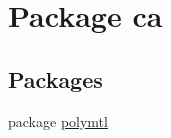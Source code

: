 \hypertarget{namespaceca}{\section{Package ca}
\label{namespaceca}
}
\subsection*{Packages}
\begin{DoxyCompactItemize}
\item 
package \hyperlink{namespaceca_1_1polymtl}{polymtl}
\end{DoxyCompactItemize}
